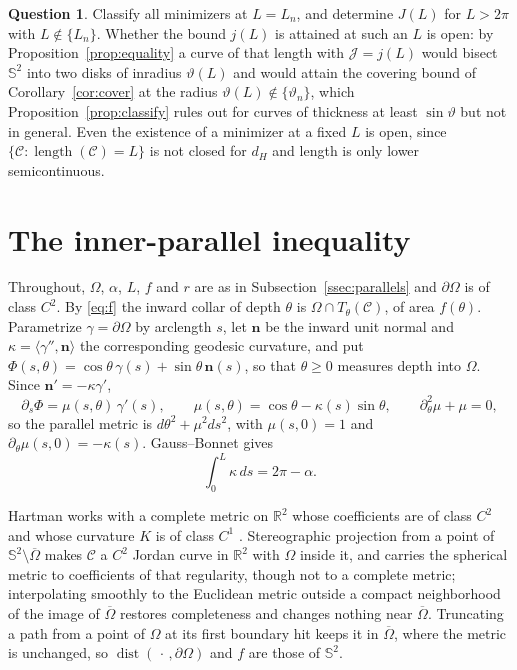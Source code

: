 \documentclass[11pt,oneside,reqno]{amsart}
\theoremstyle{plain}
\theoremstyle{definition}
\newtheorem{question}[theorem]{Question}
\DeclareMathOperator{\dist}{dist}
\DeclareMathOperator{\length}{length}
\newcommand{\Sph}{\mathbb{S}^{2}}
\newcommand{\R}{\mathbb{R}}
\begin{document}
\begin{question}
Classify all minimizers at $L=L_{n}$, and determine $J(L)$ for $L>2\pi$ with
$L\notin\{L_{n}\}$. Whether the bound $j(L)$ is attained at such an $L$ is open:
by Proposition~\ref{prop:equality} a curve of that length with
$\mathcal{J}=j(L)$ would bisect $\Sph$ into two disks of inradius $\vartheta(L)$
and would attain the covering bound of Corollary~\ref{cor:cover} at the radius
$\vartheta(L)\notin\{\vartheta_{n}\}$, which Proposition~\ref{prop:classify}
rules out for curves of thickness at least $\sin\vartheta$ but not in general.
Even the existence of a minimizer at a fixed $L$ is open, since
$\{\mathcal{C}:\length(\mathcal{C})=L\}$ is not closed for $d_{H}$ and length is
only lower semicontinuous.
\end{question}

\appendix

\section{The inner-parallel inequality}\label{app:hartman}

Throughout, $\Omega$, $\alpha$, $L$, $f$ and $r$ are as in
Subsection~\ref{ssec:parallels} and $\partial\Omega$ is of class $C^{2}$. By
\eqref{eq:f} the inward collar of depth $\theta$ is
$\Omega\cap T_{\theta}(\mathcal{C})$, of area $f(\theta)$.
Parametrize $\gamma=\partial\Omega$ by arclength $s$, let $\mathbf{n}$ be the
inward unit normal and $\kappa=\langle\gamma'',\mathbf{n}\rangle$ the
corresponding geodesic curvature, and put
$\Phi(s,\theta)=\cos\theta\,\gamma(s)+\sin\theta\,\mathbf{n}(s)$, so that
$\theta\ge0$ measures depth into $\Omega$. Since $\mathbf{n}'=-\kappa\gamma'$,
\begin{equation}\label{eq:fermi}
  \partial_{s}\Phi=\mu(s,\theta)\,\gamma'(s),\qquad
  \mu(s,\theta)=\cos\theta-\kappa(s)\sin\theta,\qquad
  \partial_{\theta}^{2}\mu+\mu=0 ,
\end{equation}
so the parallel metric is $d\theta^{2}+\mu^{2}ds^{2}$, with $\mu(s,0)=1$ and
$\partial_{\theta}\mu(s,0)=-\kappa(s)$. Gauss--Bonnet gives
\begin{equation}\label{eq:gb}
  \int_{0}^{L}\kappa\,ds=2\pi-\alpha .
\end{equation}

Hartman works with a complete metric on $\R^{2}$ whose coefficients are of class
$C^{2}$ and whose curvature $K$ is of class $C^{1}$ \cite[\S1]{Hartman64}.
Stereographic projection from a point of $\Sph\setminus\overline{\Omega}$ makes
$\mathcal{C}$ a $C^{2}$ Jordan curve in $\R^{2}$ with $\Omega$ inside it, and
carries the spherical metric to coefficients of that regularity, though not to a
complete metric; interpolating smoothly to the Euclidean metric outside a compact
neighborhood of the image of $\overline{\Omega}$ restores completeness and changes
nothing near $\overline{\Omega}$. Truncating a path from a point of $\Omega$ at
its first boundary hit keeps it in $\overline{\Omega}$, where the metric is
unchanged, so
$\dist(\,\cdot\,,\partial\Omega)$ and $f$ are those of $\Sph$.
\end{document}
